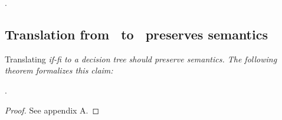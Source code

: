 \documentclass[manuscript,screen,review, 12pt, nonacm]{acmart}
\begin{document}
    
    
    
    
    .

    \subsection{Translation from \VMinus\ to \D\ preserves semantics}
    
    Translating \it{if-fi} to a decision tree should preserve semantics. The
    following theorem formalizes this claim: 

    . 
    
    \begin{proof}
        See appendix A. 
    \end{proof}
\end{document}
